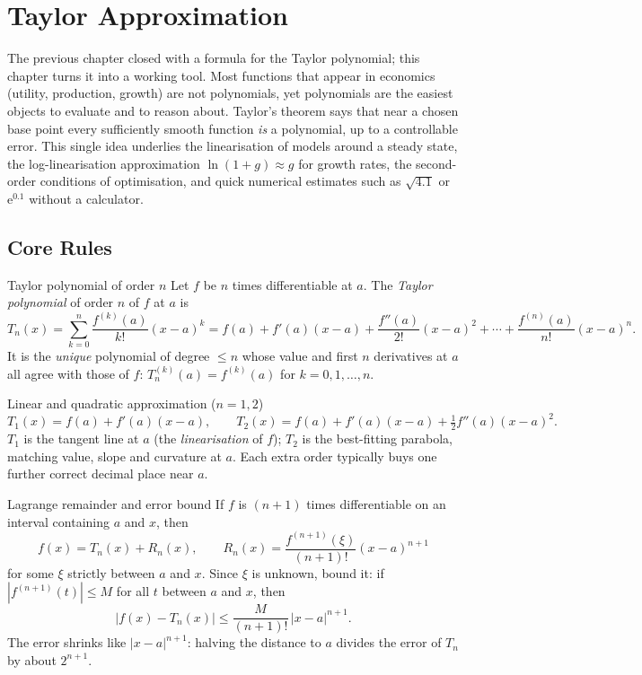 \chapter{Taylor Approximation}

The previous chapter closed with a formula for the Taylor polynomial;
this chapter turns it into a working tool. Most functions that appear in
economics (utility, production, growth) are not polynomials, yet
polynomials are the easiest objects to evaluate and to reason about.
Taylor's theorem says that near a chosen base point every sufficiently
smooth function \emph{is} a polynomial, up to a controllable error. This
single idea underlies the linearisation of models around a steady state,
the log-linearisation approximation $\ln(1+g)\approx g$ for growth rates, the
second-order conditions of optimisation, and quick numerical estimates
such as $\sqrt{4.1}$ or $\mathrm{e}^{0.1}$ without a calculator.

\section{Core Rules}

\begin{rulebox}{Taylor polynomial of order $n$}
Let $f$ be $n$ times differentiable at $a$. The \emph{Taylor polynomial}
of order $n$ of $f$ at $a$ is
\[
  T_{n}(x)=\sum_{k=0}^{n}\frac{f^{(k)}(a)}{k!}(x-a)^{k}
          =f(a)+f'(a)(x-a)+\frac{f''(a)}{2!}(x-a)^{2}+\cdots
           +\frac{f^{(n)}(a)}{n!}(x-a)^{n}.
\]
It is the \emph{unique} polynomial of degree $\leq n$ whose value and
first $n$ derivatives at $a$ all agree with those of $f$:
$T_{n}^{(k)}(a)=f^{(k)}(a)$ for $k=0,1,\ldots,n$.
\end{rulebox}

\begin{rulebox}{Linear and quadratic approximation ($n=1,2$)}
\[
  T_{1}(x)=f(a)+f'(a)(x-a),
  \qquad
  T_{2}(x)=f(a)+f'(a)(x-a)+\tfrac12 f''(a)(x-a)^{2}.
\]
$T_{1}$ is the tangent line at $a$ (the \emph{linearisation} of $f$);
$T_{2}$ is the best-fitting parabola, matching value, slope and
curvature at $a$. Each extra order typically buys one further correct
decimal place near $a$.
\end{rulebox}

\begin{rulebox}{Lagrange remainder and error bound}
If $f$ is $(n+1)$ times differentiable on an interval containing $a$ and
$x$, then
\[
  f(x)=T_{n}(x)+R_{n}(x),
  \qquad
  R_{n}(x)=\frac{f^{(n+1)}(\xi)}{(n+1)!}(x-a)^{n+1}
\]
for some $\xi$ strictly between $a$ and $x$. Since $\xi$ is unknown,
bound it: if $|f^{(n+1)}(t)|\leq M$ for all $t$ between $a$ and $x$,
then
\[
  \bigl|f(x)-T_{n}(x)\bigr|\leq\frac{M}{(n+1)!}\,|x-a|^{n+1}.
\]
The error shrinks like $|x-a|^{n+1}$: halving the distance to $a$
divides the error of $T_{n}$ by about $2^{n+1}$.
\end{rulebox}

